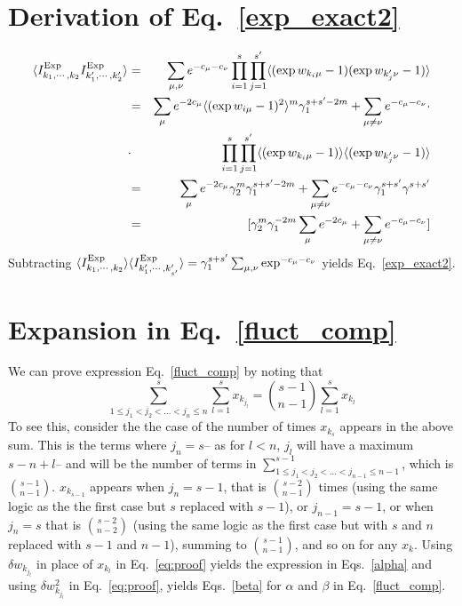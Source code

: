 \documentclass[11pt,letterpaper]{article}
\begin{document}
\section*{Derivation of Eq.~\eqref{exp_exact2}}
\label{app_expcorr}
\begin{eqnarray*}
\langle I^{\rm Exp}_{k_1,\cdots,k_2}I^{\rm Exp}_{k'_1,\cdots,k'_2}\rangle 
& = & \sum_{\mu,\nu} e^{-c_{\mu}-c_{\nu}} \prod^{s}_{i=1}\prod^{s'}_{j=1}  \langle (\exp w_{k_i\mu}-1) (\exp w_{k'_j\nu}-1)\rangle \\
&=& \sum_{\mu} e^{-2c_{\mu}}  \langle (\exp w_{i\mu}-1)^2 \rangle^m \gamma^{s+s'-2m}_1+\sum_{\mu\neq \nu} e^{-c_{\mu}-c_{\nu}} \cdot \\ &\cdot& \prod^{s}_{i=1}\prod^{s'}_{j=1}  \langle (\exp w_{k_i\mu}-1)\rangle \langle(\exp w_{k'_j\nu}-1)\rangle\\
&= & \sum_{\mu} e^{-2c_{\mu}} \gamma_2^m \gamma^{s+s'-2m}_1+\sum_{\mu\neq \nu} e^{-c_{\mu}-c_{\nu}} \gamma^{s+s'}_1 \gamma^{s+s'}\\ &= & [\gamma^m_2\gamma^{-2m}_1\sum_{\mu} e^{-2c_{\mu}}+\sum_{\mu\neq \nu} e^{-c_{\mu}-c_{\nu}}]
\end{eqnarray*}
Subtracting $\langle I^{\rm Exp}_{k_1,\cdots,k_2}\rangle \langle I^{\rm Exp}_{k'_1,\cdots,k'_{s'}}\rangle = \gamma^{s+s'}_1 \sum_{\mu,\nu} \exp^{-c_{\mu}-c_{\nu}}$ yields Eq.~\eqref{exp_exact2}.

\section*{Expansion in Eq.~\eqref{fluct_comp}}
\label{appB}

We can prove expression Eq.~\eqref{fluct_comp} by noting that 
\begin{equation}
    \sum_{1\leq j_{1}<j_{2}<...<j_{n}\leq n}^{s} \sum^{s}_{l=1} x_{k_{j_{l}}}=\binom{s-1}{n-1} \sum^{s}_{l=1} x_{k_l}
    \label{eq:proof}
\end{equation}
To see this, consider the the case of the number of times $x_{k_{s}}$ appears in the above sum. This is the terms where $j_n=s$-- as for $l<n$, $j_l$ will have a maximum $s-n+l$--  and will be the number of terms in  $\sum_{1\leq j_{1}<j_{2}<...<j_{n-1}\leq n-1}^{s-1}$, which is $\binom{s-1}{n-1}$. $x_{k_{s-1}}$ appears when $j_n=s-1$, that is $\binom{s-2}{n-1}$ times (using the same logic as the the first case but $s$ replaced with $s-1$), or $j_{n-1}=s-1$, or when $j_n=s$ that is $\binom{s-2}{n-2}$ (using the same logic as the first case but with $s$ and $n$ replaced with $s-1$ and $n-1$), summing to $\binom{s-1}{n-1}$, and so on for any $x_{k}$. Using $\delta w_{k_{j_l}}$ in place of $x_{k_l}$ in Eq.~\eqref{eq:proof} yields the expression in Eqs.~\eqref{alpha} and using $\delta w_{k_{j_l}}^2$ in Eq.~\eqref{eq:proof}, yields Eqs.~\eqref{beta} for $\alpha$ and $\beta$ in Eq.~\eqref{fluct_comp}. 
\end{document}
